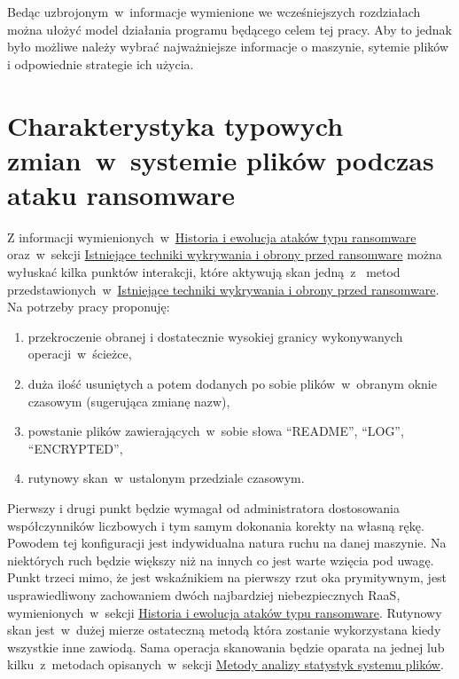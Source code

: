 Bedąc uzbrojonym~w~informacje wymienione we wcześniejszych rozdziałach można ułożyć model działania programu będącego celem tej pracy. Aby to jednak było możliwe należy wybrać najważniejsze informacje o maszynie, sytemie plików i odpowiednie strategie ich użycia.

\section{Charakterystyka typowych zmian~w~systemie plików podczas ataku ransomware}
\label{sec:charak}
Z informacji wymienionych~w~\hyperref[sec:monitorowanie]{Historia i ewolucja ataków typu ransomware} oraz~w~sekcji
\hyperref[sec:techniques]{Istniejące techniki wykrywania i obrony przed ransomware} można wyłuskać kilka punktów interakcji, które aktywują skan jedną~z~ metod przedstawionych~w~\hyperref[sec:techniques]{Istniejące techniki wykrywania i obrony przed ransomware}. Na potrzeby pracy proponuję: 
\begin{enumerate}
    \item przekroczenie obranej i dostatecznie wysokiej granicy wykonywanych operacji~w~ścieżce,
    \item duża ilość usuniętych a potem dodanych po sobie plików~w~obranym oknie czasowym (sugerująca zmianę nazw),
    \item powstanie plików zawierających~w~sobie słowa \enquote{README}, \enquote{LOG}, \enquote{ENCRYPTED},
    \item rutynowy skan~w~ustalonym przedziale czasowym.
\end{enumerate}
Pierwszy i drugi punkt będzie wymagał od administratora dostosowania współczynników liczbowych i tym samym dokonania korekty na własną rękę. Powodem tej konfiguracji jest indywidualna natura ruchu na danej maszynie. Na niektórych ruch będzie większy niż na innych co jest warte wzięcia pod uwagę. Punkt trzeci mimo, że jest wskaźnikiem na pierwszy rzut oka prymitywnym, jest usprawiedliwony zachowaniem dwóch najbardziej niebezpiecznych RaaS, wymienionych~w~sekcji \hyperref[sec:monitorowanie]{Historia i ewolucja ataków typu ransomware}. Rutynowy skan jest~w~dużej mierze ostateczną metodą która zostanie wykorzystana kiedy wszystkie inne zawiodą. Sama operacja skanowania będzie oparata na jednej lub kilku~z~metodach opisanych~w~sekcji \hyperref[sec:metody]{Metody analizy statystyk systemu plików}.
\newpage
